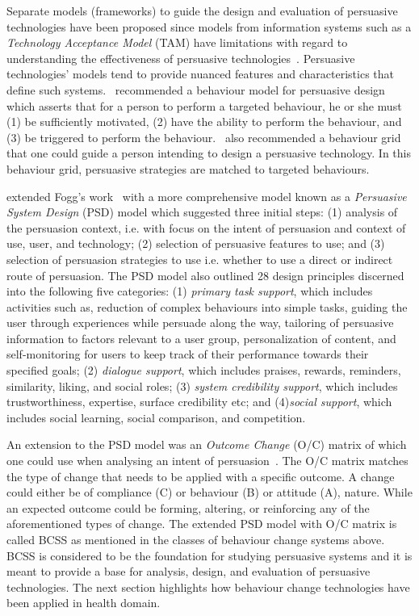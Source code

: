 Separate models (frameworks) to guide the design and evaluation of persuasive technologies have been proposed since models from information systems such as a \emph{Technology Acceptance Model} (TAM) have limitations with regard to understanding the effectiveness of persuasive technologies~\citep{Oinas-kukkonen:psd}. Persuasive technologies' models tend to provide nuanced features and characteristics that define such systems.~\cite{fogg2009behavior} recommended a behaviour model for persuasive design which asserts that for a person to perform a targeted behaviour, he or she must (1) be sufficiently motivated, (2) have the ability to perform the behaviour, and (3) be triggered to perform the behaviour.~\cite{fogg2009behavior2} also recommended a behaviour grid that one could guide a person intending to design a persuasive technology. In this behaviour grid, persuasive strategies are matched to targeted behaviours. 

\cite{Oinas-kukkonen:psd} extended Fogg's work~\citep{fogg2009behavior} with a more comprehensive model known as a \emph{Persuasive System Design} (PSD) model which suggested three initial steps: (1) analysis of the persuasion context, i.e. with focus on the intent of persuasion and context of use, user, and technology; (2) selection of persuasive features to use; and (3) selection of persuasion strategies to use i.e. whether to use a direct or indirect route of persuasion. The PSD model also outlined 28 design principles discerned into the following five categories: (1) \emph{primary task support}, which includes activities such as, reduction of complex behaviours into simple tasks, guiding the user through experiences while persuade along the way, tailoring of persuasive information to factors relevant to a user group, personalization of content, and self-monitoring for users to keep track of their performance towards their specified goals; (2) \emph{dialogue support}, which includes praises, rewards, reminders, similarity, liking, and social roles; (3) \emph{system credibility support}, which includes trustworthiness, expertise, surface credibility etc; and (4)\emph{social support}, which includes social learning, social comparison, and competition.

An extension to the PSD model was an \emph{Outcome Change} (O/C) matrix of which one could use when analysing an intent of persuasion~\citep{Oinas-Kukkonen:foundation}. The O/C matrix matches the type of change that needs to be applied with a specific outcome. A change could either be of compliance (C) or behaviour (B) or attitude (A), nature. While an expected outcome could be forming, altering, or reinforcing any of the aforementioned types of change. The extended PSD model with O/C matrix is called BCSS as mentioned in the classes of behaviour change systems above. BCSS is considered to be the foundation for studying persuasive systems and it is meant to provide a base for analysis, design, and evaluation of persuasive technologies. The next section highlights how behaviour change technologies have been applied in health domain.

